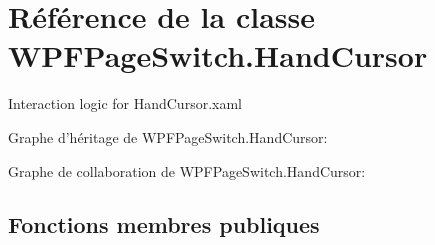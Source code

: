 \hypertarget{class_w_p_f_page_switch_1_1_hand_cursor}{\section{Référence de la classe W\+P\+F\+Page\+Switch.\+Hand\+Cursor}
\label{class_w_p_f_page_switch_1_1_hand_cursor}
}


Interaction logic for Hand\+Cursor.\+xaml  




Graphe d'héritage de W\+P\+F\+Page\+Switch.\+Hand\+Cursor\+:


Graphe de collaboration de W\+P\+F\+Page\+Switch.\+Hand\+Cursor\+:
\subsection*{Fonctions membres publiques}
